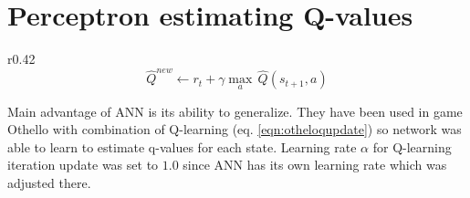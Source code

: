 \section{Perceptron estimating Q-values}
\begin{wrapfigure}{r}{0.42\textwidth}
  \vspace*{-0.95cm}
  \begin{equation}
    \label{eqn:otheloqupdate}
    \hat{Q}^{new}\!\leftarrow\!r_t\!+\!{\gamma}{\max_a}\,\hat{Q}(s_{t+1},\!a)
  \end{equation}
  \vspace*{-0.95cm}
\end{wrapfigure}

Main advantage of ANN is its ability to generalize. They have been used
in game Othello \cite{othello} with combination of Q-learning
(eq. \ref{eqn:otheloqupdate}) so network was able to learn to estimate q-values
for each state. Learning rate $\alpha$ for Q-learning iteration update was
set to $1.0$ since ANN has its own learning rate which was adjusted there.


